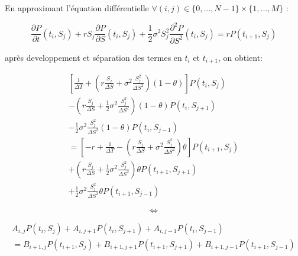 \documentclass[10pt]{article}
\begin{document}
  En approximant l'équation différentielle $\forall (i, j) \in \{0, ..., N-1\} \times \{1, ..., M\}$ :
  
  $$
  \boxed{
    \frac{\partial P}{\partial t}(t_i, S_j) + r S_j \frac{\partial P}{\partial S}(t_i, S_j) + \frac{1}{2} \sigma^2 S_j^2 \frac{\partial^2 P}{\partial S^2}(t_i, S_j) = r P(t_{i + 1}, S_j)
  }
  $$
  
  après developpement et séparation des termes en $t_i$ et $t_{i+1}$, on obtient:
  \begin{framed} 
    \begin{align*}
      \left[\frac{1}{\Delta T} + \left(r \frac{S_j}{\Delta S} + \sigma^2 \frac{S_j^2}{\Delta S^2} \right) (1 - \theta)\right] P(t_i, S_j) \\
      - \left( r \frac{S_j}{\Delta S} + \frac{1}{2} \sigma^2 \frac{S_j^2}{\Delta S^2} \right) (1 - \theta) P(t_i, S_{j + 1}) \\
      - \frac{1}{2} \sigma^2 \frac{S_j^2}{\Delta S^2} (1 - \theta) P(t_i, S_{j - 1}) \\
      = \left[-r + \frac{1}{\Delta T} - \left(r \frac{S_j}{\Delta S} + \sigma^2 \frac{S_j^2}{\Delta S^2}\right) \theta \right] P(t_{i + 1}, S_j) \\
      + \left( r \frac{S_j}{\Delta S} + \frac{1}{2} \sigma^2 \frac{S_j^2}{\Delta S^2} \right) \theta P(t_{i + 1}, S_{j + 1}) \\
      + \frac{1}{2} \sigma^2 \frac{S_j^2}{\Delta S^2} \theta P(t_{i + 1}, S_{j - 1})
    \end{align*}
  \end{framed}
  
  $$\Leftrightarrow$$
  
  \begin{align*}
    A_{i, j} P(t_i, S_j) + A_{i, j+1} P(t_i, S_{j + 1}) + A_{i, j-1} P(t_i, S_{j - 1}) \\
    = B_{i + 1, j} P(t_{i + 1}, S_j) + B_{i+1, j+1} P(t_{i + 1}, S_{j + 1}) + B_{i+1, j-1} P(t_{i + 1}, S_{j - 1})
  \end{align*}
  
\end{document}
